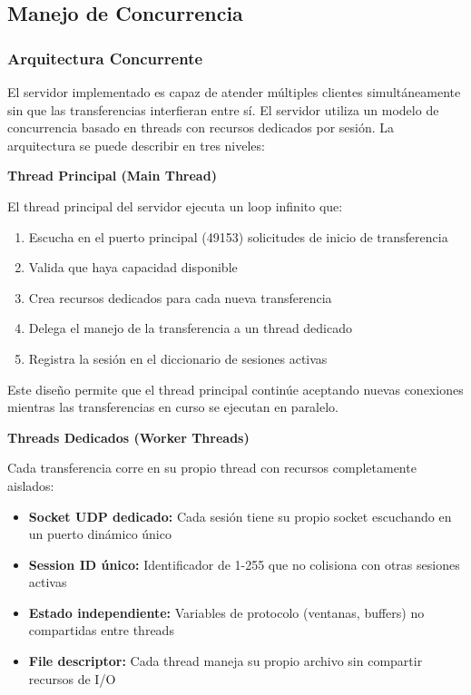 \subsection{Manejo de Concurrencia}

\subsubsection{Arquitectura Concurrente}
El servidor implementado es capaz de atender múltiples clientes simultáneamente sin que las transferencias interfieran entre sí.
El servidor utiliza un modelo de concurrencia basado en threads con recursos dedicados por sesión. La arquitectura se puede describir en tres niveles:

\textbf{Thread Principal (Main Thread)}

El thread principal del servidor ejecuta un loop infinito que:

\begin{enumerate}
    \item Escucha en el puerto principal (49153) solicitudes de inicio de transferencia
    \item Valida que haya capacidad disponible
    \item Crea recursos dedicados para cada nueva transferencia
    \item Delega el manejo de la transferencia a un thread dedicado
    \item Registra la sesión en el diccionario de sesiones activas
\end{enumerate}

Este diseño permite que el thread principal continúe aceptando nuevas conexiones mientras las transferencias en curso se ejecutan en paralelo.

\textbf{Threads Dedicados (Worker Threads)}

Cada transferencia corre en su propio thread con recursos completamente aislados:

\begin{itemize}
    \item \textbf{Socket UDP dedicado:} Cada sesión tiene su propio socket escuchando en un puerto dinámico único
    \item \textbf{Session ID único:} Identificador de 1-255 que no colisiona con otras sesiones activas
    \item \textbf{Estado independiente:} Variables de protocolo (ventanas, buffers) no compartidas entre threads
    \item \textbf{File descriptor:} Cada thread maneja su propio archivo sin compartir recursos de I/O
\end{itemize}

